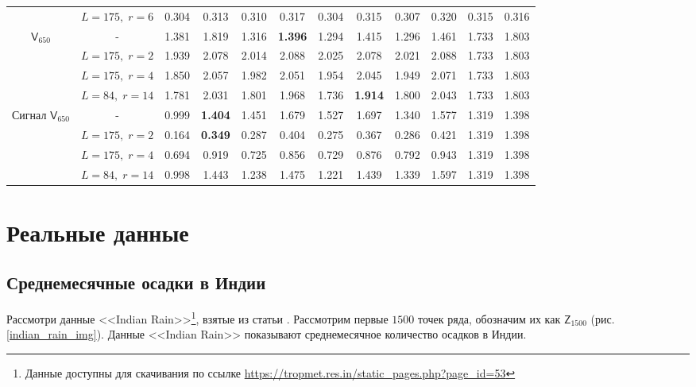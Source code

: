\documentclass[specialist,
               substylefile = spbu.rtx,
               subf,href,colorlinks=true, 12p]{disser}
\begin{document}
\begin{landscape}
\begin{table}[h]
\begin{center}
\begin{tabular}{|cc||cc|cc|cc|cc||cc|}
			& $L = 175, \; r = 6$ &  0.304 &  0.313 &  0.310 &  0.317 &  0.304 &  0.315 &   0.307 &   0.320 &  0.315 &  0.316 \\
			$\mathsf{V}_{650}$ & - &  1.381 &  1.819 &  1.316 &  \textbf{1.396} &  1.294 &  1.415 &   1.296 &   1.461 &  1.733 &  1.803 \\
			& $L = 175, \; r = 2$ &  1.939 &  2.078 &  2.014 &  2.088 &  2.025 &  2.078 &   2.021 &   2.088 &  1.733 &  1.803 \\
			& $L = 175, \; r = 4$ &  1.850 &  2.057 &  1.982 &  2.051 &  1.954 &  2.045 &   1.949 &   2.071 &  1.733 &  1.803 \\
			& $L = 84, \; r = 14$ &  1.781 &  2.031 &  1.801 &  1.968 &  1.736 &  \textbf{1.914} &   1.800 &   2.043 &  1.733 &  1.803 \\
			Сигнал $\mathsf{V}_{650}$ & - &  0.999 &  \textbf{1.404} &  1.451 &  1.679 &  1.527 &  1.697 &   1.340 &   1.577 &  1.319 &  1.398 \\
			& $L = 175, \; r = 2$ &  0.164 &  \textbf{0.349} &  0.287 &  0.404 &  0.275 &  0.367 &   0.286 &   0.421 &  1.319 &  1.398 \\
			& $L = 175, \; r = 4$ &  0.694 &  0.919 &  0.725 &  0.856 &  0.729 &  0.876 &   0.792 &   0.943 &  1.319 &  1.398 \\
			& $L = 84, \; r = 14$  &  0.998 &  1.443 &  1.238 &  1.475 &  1.221 &  1.439 &   1.339 &   1.597 &  1.319 &  1.398 \\
			\bottomrule
		\end{tabular}
	\end{center}
	\label{bigtable}
\end{table}
\end{landscape}

\chapter{Реальные данные}
\label{chapter_realdata}
\section{Среднемесячные осадки в Индии}
\label{indian_rain}

Рассмотри данные <<Indian Rain>>\footnote{Данные доступны для скачивания по ссылке \url{https://tropmet.res.in/static_pages.php?page_id=53} }, взятые из статьи \cite{ar1}. Рассмотрим первые $1500$ точек ряда, обозначим их как $\mathsf{Z}_{1500}$ (рис. \ref{indian_rain_img}). Данные <<Indian Rain>> показывают среднемесячное количество осадков в Индии.
\end{document}
